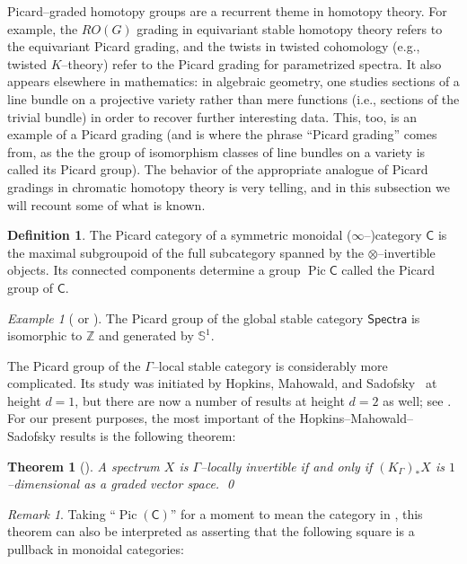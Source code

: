 \documentclass{amsart}
\newcommand{\Z}{\mathbb Z}
\renewcommand{\S}{\mathbb S}
\newcommand{\<}{\langle}
\renewcommand{\>}{\rangle}
\newcommand{\CatOf}[1]{\mathsf{#1}}
\DeclareMathOperator{\Pic}{Pic}
\theoremstyle{plain}
\newtheorem*{theorem}{Theorem}
\theoremstyle{definition}
\newtheorem*{definition}{Definition}
\theoremstyle{remark}
\newtheorem*{remark}{Remark}
\newtheorem*{example}{Example}
\begin{document}
Picard--graded homotopy groups are a recurrent theme in homotopy theory.  For example, the $RO(G)$ grading in equivariant stable homotopy theory refers to the equivariant Picard grading, and the twists in twisted cohomology (e.g., twisted $K$--theory) refer to the Picard grading for parametrized spectra.  It also appears elsewhere in mathematics: in algebraic geometry, one studies sections of a line bundle on a projective variety rather than mere functions (i.e., sections of the trivial bundle) in order to recover further interesting data.  This, too, is an example of a Picard grading (and is where the phrase ``Picard grading'' comes from, as the the group of isomorphism classes of line bundles on a variety is called its Picard group).  The behavior of the appropriate analogue of Picard gradings in chromatic homotopy theory is very telling, and in this subsection we will recount some of what is known.

\begin{definition}\label{DefnPicardGroup}
The Picard category of a symmetric monoidal ($\infty$--)category $\CatOf{C}$ is the maximal subgroupoid of the full subcategory spanned by the $\otimes$--invertible objects.  Its connected components determine a group $\Pic \CatOf{C}$ called the Picard group of $\CatOf C$.
\end{definition}

\begin{example}[{\cite[pg. 90]{HMS} or \cite[Theorem 2.2]{StricklandInterpolate}}]\label{GlobalPicardGroup}
The Picard group of the global stable category $\CatOf{Spectra}$ is isomorphic to $\Z$ and generated by $\S^1$.
\end{example}

The Picard group of the $\Gamma$--local stable category is considerably more complicated.  Its study was initiated by Hopkins, Mahowald, and Sadofsky~\cite{HMS} at height $d = 1$, but there are now a number of results at height $d = 2$ as well; see .  For our present purposes, the most important of the Hopkins--Mahowald--Sadofsky results is the following theorem:

\begin{theorem}[{\cite[Theorem 1.3]{HMS}}]\label{HMSLines}
A spectrum $X$ is $\Gamma$--locally invertible if and only if $(K_\Gamma)_* X$ is $1$--dimensional as a graded vector space. \qed
\end{theorem}

\begin{remark}
Taking ``$\Pic(\CatOf{C})$'' for a moment to mean the category in , this theorem can also be interpreted as asserting that the following square is a pullback in monoidal categories:
\begin{center}
\end{center}
\end{remark}
\end{document}
